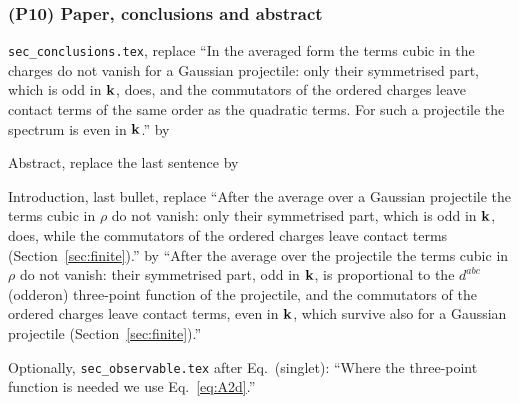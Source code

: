 \subsubsection*{(P10) Paper, conclusions and abstract}
\noindent \texttt{sec\_conclusions.tex}, replace ``In the averaged form the terms cubic in the charges do not vanish for a Gaussian projectile: only their symmetrised part, which is odd in $\mathbf{k}$, does, and the commutators of the ordered charges leave contact terms of the same order as the quadratic terms. For such a projectile the spectrum is even in $\mathbf{k}$.'' by\par\smallskip
\noindent{}\par\smallskip
\noindent Abstract, replace the last sentence by\par\smallskip
\noindent{}\par\smallskip
\noindent Introduction, last bullet, replace ``After the average over a Gaussian projectile the terms cubic in $\rho$ do not vanish: only their symmetrised part, which is odd in $\mathbf{k}$, does, while the commutators of the ordered charges leave contact terms (Section~\ref{sec:finite}).'' by ``After the average over the projectile the terms cubic in $\rho$ do not vanish: their symmetrised part, odd in $\mathbf{k}$, is proportional to the $d^{abc}$ (odderon) three-point function of the projectile, and the commutators of the ordered charges leave contact terms, even in $\mathbf{k}$, which survive also for a Gaussian projectile (Section~\ref{sec:finite}).''\par
\noindent Optionally, \texttt{sec\_observable.tex} after Eq.~(singlet): ``Where the three-point function is needed we use Eq.~\eqref{eq:A2d}.''

